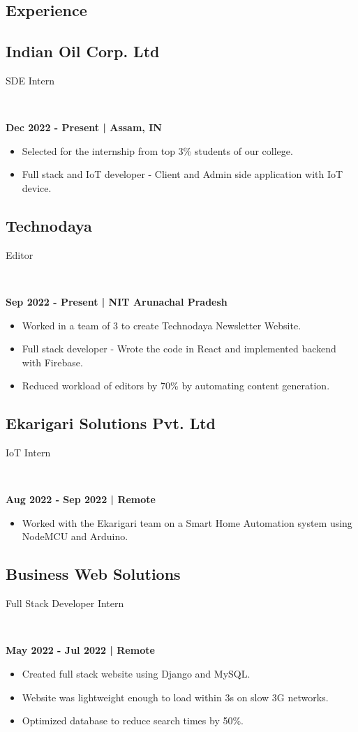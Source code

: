 \documentclass[]{article}
\newcommand{\subheading}[2]{
  {\subsection{#1}
  \hfill \normalsize#2} \\
  \vspace{2pt}
}
\newcommand{\datelocation}[1]{
  {\color{date}\fontsize{10pt}{12pt}\bfseries { #1 } \normalfont\\}
}
\newenvironment{tightemize}{
\vspace{-\topsep}\begin{itemize}\itemsep1pt \parskip0pt \parsep0pt}
{\end{itemize}\vspace{-\topsep}}
\begin{document}
\begin{multicols}{2}
\begin{flushleft}
    
    \section{Experience}
    \subheading{Indian Oil Corp. Ltd}{SDE Intern}
    \datelocation{Dec 2022 - Present | Assam, IN}

    \begin{tightemize}
      \item Selected for the internship from top 3\% students of our college.
      \item Full stack and IoT developer - Client and Admin side application with IoT device. 
    \end{tightemize}

    \subheading{Technodaya}{Editor}
    \datelocation{Sep 2022 - Present | NIT Arunachal Pradesh}
    \begin{tightemize}
      \item Worked in a team of 3 to create Technodaya Newsletter Website.
      \item Full stack developer - Wrote the code in React and implemented backend with Firebase.
      \item Reduced workload of editors by 70\% by automating content generation.
    \end{tightemize}

    \subheading{Ekarigari Solutions Pvt. Ltd}{IoT Intern}
    {
      \color{date}\fontsize{10pt}{12pt}\bfseries
      Aug 2022 - Sep 2022 | Remote
    }
    \begin{tightemize}
      \item Worked with the Ekarigari team on a Smart Home Automation system using NodeMCU and Arduino.
    \end{tightemize}

    \subheading{Business Web Solutions}{Full Stack Developer Intern}
    \datelocation{May 2022 - Jul 2022 | Remote}
    \begin{tightemize}
      \item Created full stack website using Django and MySQL.
      \item Website was lightweight enough to load within 3s on slow 3G networks.
      \item Optimized database to reduce search times by 50\%. 
    \end{tightemize}

    \columnbreak


\end{flushleft}
\end{multicols}
\end{document}
